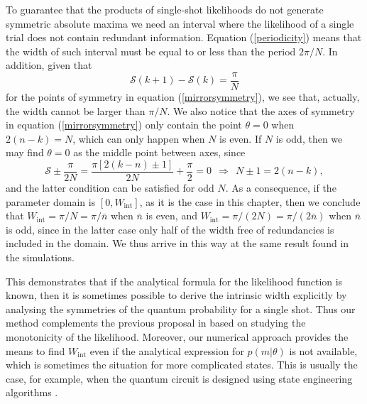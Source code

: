 To guarantee that the products of single-shot likelihoods do not generate symmetric absolute maxima we need an interval where the likelihood of a single trial does not contain redundant information. Equation (\ref{periodicity}) means that the width of such interval must be  equal to or less than the period $2\pi/N$. In addition, given that
\begin{equation}
\mathcal{S}(k+1) - \mathcal{S}(k) = \frac{\pi}{N}
\end{equation}
for the points of symmetry in equation (\ref{mirrorsymmetry}), we see that, actually, the width cannot be larger than $\pi/N$. We also notice that the axes of symmetry in equation (\ref{mirrorsymmetry}) only contain the point $\theta = 0$ when $2(n-k) = N$, which can only happen when $N$ is even. If $N$ is odd, then we may find $\theta = 0$ as the middle point between axes, since
\begin{equation}
\mathcal{S} \pm \frac{\pi}{2N} = \frac{\pi\left[2\left(k-n\right) \pm 1 \right]}{2N} + \frac{\pi}{2} = 0 ~~\Rightarrow~~ N \pm 1 =2(n-k),
\end{equation}
and the latter condition can be satisfied for odd $N$. As a consequence, if the parameter domain is $[0, W_\mathrm{int}]$, as it is the case in this chapter, then we conclude that $W_\mathrm{int} = \pi/N = \pi/\bar{n}$ when $\bar{n}$ is even, and $W_\mathrm{int} = \pi/(2N) = \pi/(2\bar{n})$ when $\bar{n}$ is odd, since in the latter case only half of the width free of redundancies is included in the domain. We thus arrive in this way at the same result found in the simulations.

This demonstrates that if the analytical formula for the likelihood function is known, then it is sometimes possible to derive the intrinsic width explicitly by analysing the symmetries of the quantum probability for a single shot. Thus our method complements the previous proposal in \cite{kolodynski2014} based on studying the monotonicity of the likelihood. Moreover, our numerical approach provides the means to find $W_\mathrm{int}$ even if the analytical expression for $p(m|\theta)$ is not available, which is sometimes the situation for more complicated states. This is usually the case, for example, when the quantum circuit is designed using state engineering algorithms \cite{knott2016}.

